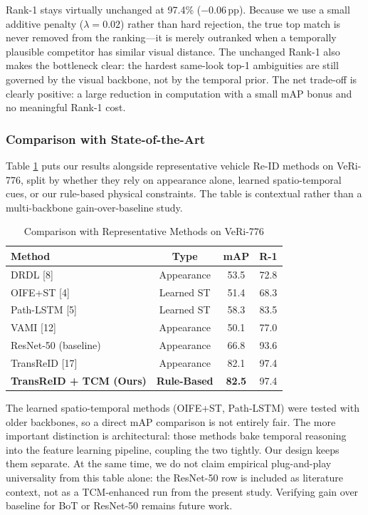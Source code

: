 \documentclass{ijitcs}
\newcommand{\rev}[1]{#1}
\begin{document}
Rank-1 stays virtually unchanged at 97.4\% ($-$0.06\,pp). Because we use a small additive penalty ($\lambda = 0.02$) rather than hard rejection, the true top match is never removed from the ranking---it is merely outranked when a temporally plausible competitor has similar visual distance. \rev{The unchanged Rank-1 also makes the bottleneck clear: the hardest same-look top-1 ambiguities are still governed by the visual backbone, not by the temporal prior.} The net trade-off is clearly positive: a large reduction in computation with a small mAP bonus and no meaningful Rank-1 cost.

\subsubsection{Comparison with State-of-the-Art}
Table \ref{tab:sota} puts our results alongside representative vehicle Re-ID methods on VeRi-776, split by whether they rely on appearance alone, learned spatio-temporal cues, or our rule-based physical constraints. \rev{The table is contextual rather than a multi-backbone gain-over-baseline study.}

\begin{table}[htbp]
\caption{Comparison with Representative Methods on VeRi-776}
\begin{center}
\begin{tabular}{lccc}
\toprule
\textbf{Method} & \textbf{Type} & \textbf{mAP} & \textbf{R-1} \\
\midrule
DRDL [8] & Appearance & 53.5 & 72.8 \\
OIFE+ST [4] & Learned ST & 51.4 & 68.3 \\
Path-LSTM [5] & Learned ST & 58.3 & 83.5 \\
VAMI [12] & Appearance & 50.1 & 77.0 \\
ResNet-50 (baseline) & Appearance & 66.8 & 93.6 \\
TransReID [17] & Appearance & 82.1 & 97.4 \\
\midrule
\textbf{TransReID + TCM (Ours)} & \textbf{Rule-Based} & \textbf{82.5} & 97.4 \\
\bottomrule
\end{tabular}
\label{tab:sota}
\end{center}
\end{table}

The learned spatio-temporal methods (OIFE+ST, Path-LSTM) were tested with older backbones, so a direct mAP comparison is not entirely fair. The more important distinction is architectural: those methods bake temporal reasoning into the feature learning pipeline, coupling the two tightly. Our design keeps them separate. \rev{At the same time, we do not claim empirical plug-and-play universality from this table alone: the ResNet-50 row is included as literature context, not as a TCM-enhanced run from the present study. Verifying gain over baseline for BoT or ResNet-50 remains future work.}
\end{document}

